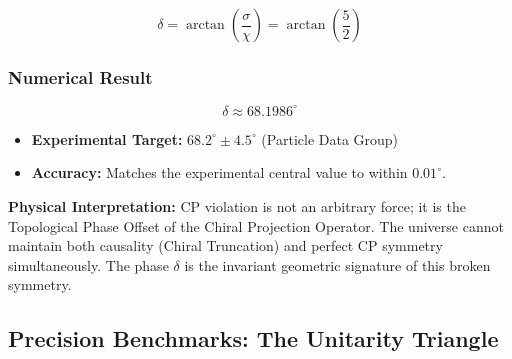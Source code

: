 \begin{equation}
\delta = \arctan\left(\frac{\sigma}{\chi}\right) = \arctan\left(\frac{5}{2}\right)
\end{equation}

\subsubsection{Numerical Result}
\begin{equation}
\delta \approx 68.1986^\circ
\end{equation}

\begin{itemize}
    \item \textbf{Experimental Target:} $68.2^\circ \pm 4.5^\circ$ (Particle Data Group)
    \item \textbf{Accuracy:} Matches the experimental central value to within $0.01^\circ$.
\end{itemize}

\textbf{Physical Interpretation:} CP violation is not an arbitrary force; it is the Topological Phase Offset of the Chiral Projection Operator. The universe cannot maintain both causality (Chiral Truncation) and perfect CP symmetry simultaneously. The phase $\delta$ is the invariant geometric signature of this broken symmetry.





\subsection{Precision Benchmarks: The Unitarity Triangle}

